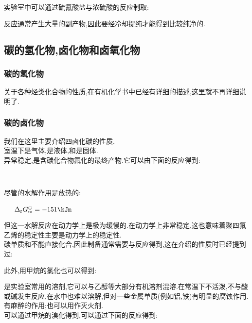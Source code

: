 \documentclass{ctexart}
\begin{document}
\indent 实验室中可以通过硫氰酸盐与浓硫酸的反应制取:
\begin{center}
\end{center}
反应通常产生大量的副产物,因此要经冷却提纯才能得到比较纯净的.
\subsection{碳的氢化物,卤化物和卤氧化物}
\subsubsection{碳的氢化物}
关于各种烃类化合物的性质,在有机化学书中已经有详细的描述,这里就不再详细说明了.
\subsubsection{碳的卤化物}
我们在这里主要介绍四卤化碳的性质.\\
\indent 室温下是气体,是液体,和是固体.\\
\indent {}异常稳定,是含碳化合物氟化的最终产物.它可以由下面的反应得到:
\begin{center}
    \\
\end{center}
尽管的水解作用是放热的:
\begin{center}
    \ \ \ $\Delta_\text rG_\text m^\ominus=-151\kJm$
\end{center}
但这一水解反应在动力学上是极为缓慢的.在动力学上非常稳定,这也意味着聚四氟乙烯的稳定性主要是动力学上的稳定性.\\
\indent 碳单质和不能直接化合,因此制备通常需要与反应得到,这在介绍的性质时已经提到过:
\begin{center}
\end{center}
此外,用甲烷的氯化也可以得到:
\begin{center}
\end{center}
是实验室常用的溶剂,它可以与乙醇等大部分有机溶剂混溶.在常温下不活泼,不与酸或碱发生反应,在水中也难以溶解,但对一些金属单质(例如铝,铁)有明显的腐蚀作用.有麻醉的作用;也可以用作灭火剂.\\
\indent {}可以通过甲烷的溴化得到,可以通过下面的反应得到:
\begin{center}
\end{center}
\end{document}
